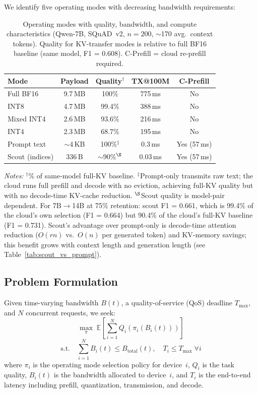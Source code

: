 \documentclass[journal]{IEEEtran}
\begin{document}
We identify five operating modes with decreasing bandwidth requirements:

\begin{table}[t]
\centering
\caption{Operating modes with quality, bandwidth, and compute characteristics (Qwen-7B, SQuAD~v2, $n = 200$, $\sim$170 avg.\ context tokens). Quality for KV-transfer modes is relative to full BF16 baseline (same model, F1 = 0.608). C-Prefill = cloud re-prefill required.}
\label{tab:operating_points}
\small
\begin{tabular}{@{}lcccc@{}}
\toprule
\textbf{Mode} & \textbf{Payload} & \textbf{Quality$^\dagger$} & \textbf{TX@100M} & \textbf{C-Prefill} \\
\midrule
Full BF16       & 9.7\,MB   & 100\%  & 775\,ms & No \\
INT8            & 4.7\,MB   & 99.4\% & 388\,ms & No \\
Mixed INT4      & 2.6\,MB   & 93.6\% & 216\,ms & No \\
INT4            & 2.3\,MB   & 68.7\% & 195\,ms & No \\
\midrule
Prompt text     & $\sim$4\,KB & 100\%$^\ddagger$ & 0.3\,ms & Yes (57\,ms) \\
Scout (indices) & 336\,B    & $\sim$90\%$^\S$ & 0.03\,ms & Yes (57\,ms) \\
\bottomrule
\end{tabular}
\end{table}

\noindent\emph{Notes:}
$^\dagger$\% of same-model full-KV baseline.
$^\ddagger$Prompt-only transmits raw text; the cloud runs full prefill and decode with no eviction, achieving full-KV quality but with no decode-time KV-cache reduction.
$^\S$Scout quality is model-pair dependent.
For 7B$\to$14B at 75\% retention: scout F1 = 0.661, which is 99.4\% of the cloud's own selection (F1 = 0.664) but 90.4\% of the cloud's full-KV baseline (F1 = 0.731).
Scout's advantage over prompt-only is decode-time attention reduction ($O(rn)$ vs.\ $O(n)$ per generated token) and KV-memory savings; this benefit grows with context length and generation length (see Table~\ref{tab:scout_vs_prompt}).

\subsection{Problem Formulation}

Given time-varying bandwidth $B(t)$, a quality-of-service (QoS) deadline $T_{\max}$, and $N$ concurrent requests, we seek:
\begin{equation}
    \max_{\pi} \; \mathbb{E}\left[\sum_{i=1}^{N} Q_i(\pi_i(B_i(t)))\right]
    \label{eq:objective}
\end{equation}
\vspace{-2mm}
\begin{equation}
    \text{s.t.} \quad \sum_{i=1}^{N} B_i(t) \leq B_{\text{total}}(t), \quad T_i \leq T_{\max} \; \forall i
\end{equation}
where $\pi_i$ is the operating mode selection policy for device~$i$, $Q_i$ is the task quality, $B_i(t)$ is the bandwidth allocated to device~$i$, and $T_i$ is the end-to-end latency including prefill, quantization, transmission, and decode.
\end{document}
